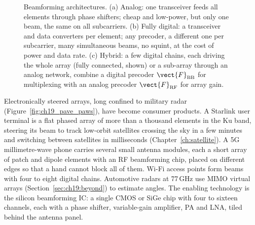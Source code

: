 \begin{figure}[htbp]
\caption{Beamforming architectures. (a) Analog: one transceiver feeds all elements through
phase shifters; cheap and low-power, but only one beam, the same on all subcarriers. (b) Fully
digital: a transceiver and data converters per element; any precoder, a different one per
subcarrier, many simultaneous beams, no squint, at the cost of power and data rate. (c) Hybrid: a
few digital chains, each driving the whole array (fully connected, shown) or a sub-array through an
analog network, combine a digital precoder $\vect{F}_{\text{BB}}$ for multiplexing with an analog
precoder $\vect{F}_{\text{RF}}$ for array gain.}
\label{fig:ch19_bfarch}
\end{figure}

\begin{inpractice}
Electronically steered arrays, long confined to military radar
(Figure~\ref{fig:ch19_pave_paws}), have become consumer products. A Starlink user terminal is a flat
phased array of more than a thousand elements in the Ku band, steering its beam to track low-orbit
satellites crossing the sky in a few minutes and switching between satellites in milliseconds
(Chapter~\ref{ch:satellite}). A 5G millimetre-wave phone carries several small antenna modules,
each a short array of patch and dipole elements with an RF beamforming chip, placed on different
edges so that a hand cannot block all of them. Wi-Fi access points form beams with four to eight
digital chains. Automotive radars at 77\,GHz use MIMO virtual arrays (Section~\ref{sec:ch19:beyond})
to estimate angles. The enabling technology is the silicon beamforming IC: a single CMOS or SiGe
chip with four to sixteen channels, each with a phase shifter, variable-gain amplifier, PA and LNA,
tiled behind the antenna panel.
\end{inpractice}

